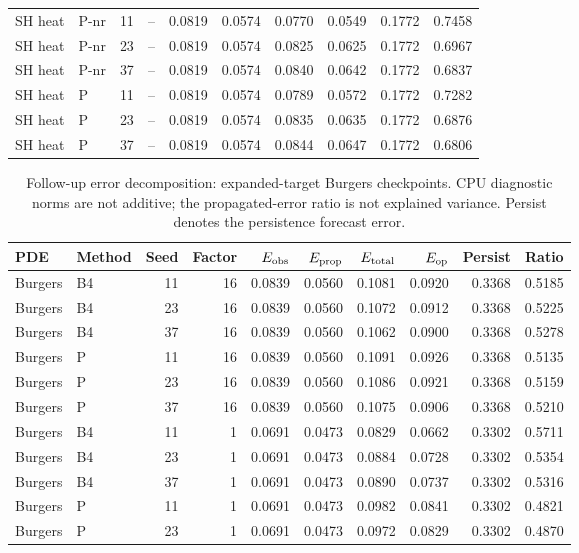 \begin{table}[ht]
\begin{tabular}{@{}llrrrrrrrr@{}}
SH heat & P-nr & 11 & -- & 0.0819 & 0.0574 & 0.0770 & 0.0549 & 0.1772 & 0.7458\\
SH heat & P-nr & 23 & -- & 0.0819 & 0.0574 & 0.0825 & 0.0625 & 0.1772 & 0.6967\\
SH heat & P-nr & 37 & -- & 0.0819 & 0.0574 & 0.0840 & 0.0642 & 0.1772 & 0.6837\\
SH heat & P & 11 & -- & 0.0819 & 0.0574 & 0.0789 & 0.0572 & 0.1772 & 0.7282\\
SH heat & P & 23 & -- & 0.0819 & 0.0574 & 0.0835 & 0.0635 & 0.1772 & 0.6876\\
SH heat & P & 37 & -- & 0.0819 & 0.0574 & 0.0844 & 0.0647 & 0.1772 & 0.6806\\
\bottomrule\end{tabular}
\end{table}
\begin{table}[ht]
\centering\small
\caption{Follow-up error decomposition: expanded-target Burgers checkpoints. CPU diagnostic norms are not additive; the propagated-error ratio is not explained variance. Persist denotes the persistence forecast error.}
\begin{tabular}{@{}llrrrrrrrr@{}}\toprule
PDE & Method & Seed & Factor & $E_{\rm obs}$ & $E_{\rm prop}$ & $E_{\rm total}$ & $E_{\rm op}$ & Persist & Ratio\\\midrule
Burgers & B4 & 11 & 16 & 0.0839 & 0.0560 & 0.1081 & 0.0920 & 0.3368 & 0.5185\\
Burgers & B4 & 23 & 16 & 0.0839 & 0.0560 & 0.1072 & 0.0912 & 0.3368 & 0.5225\\
Burgers & B4 & 37 & 16 & 0.0839 & 0.0560 & 0.1062 & 0.0900 & 0.3368 & 0.5278\\
Burgers & P & 11 & 16 & 0.0839 & 0.0560 & 0.1091 & 0.0926 & 0.3368 & 0.5135\\
Burgers & P & 23 & 16 & 0.0839 & 0.0560 & 0.1086 & 0.0921 & 0.3368 & 0.5159\\
Burgers & P & 37 & 16 & 0.0839 & 0.0560 & 0.1075 & 0.0906 & 0.3368 & 0.5210\\
Burgers & B4 & 11 & 1 & 0.0691 & 0.0473 & 0.0829 & 0.0662 & 0.3302 & 0.5711\\
Burgers & B4 & 23 & 1 & 0.0691 & 0.0473 & 0.0884 & 0.0728 & 0.3302 & 0.5354\\
Burgers & B4 & 37 & 1 & 0.0691 & 0.0473 & 0.0890 & 0.0737 & 0.3302 & 0.5316\\
Burgers & P & 11 & 1 & 0.0691 & 0.0473 & 0.0982 & 0.0841 & 0.3302 & 0.4821\\
Burgers & P & 23 & 1 & 0.0691 & 0.0473 & 0.0972 & 0.0829 & 0.3302 & 0.4870\\

\end{tabular}
\end{table}
